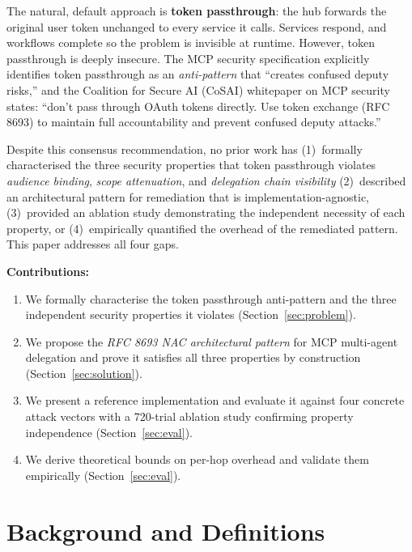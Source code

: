\documentclass[journal]{IEEEtran}
\begin{document}
The natural, default approach is \textbf{token passthrough}: the hub forwards
the original user token unchanged to every service it calls. Services respond,
and workflows complete so the problem is invisible at runtime. However,
token passthrough is deeply insecure. The MCP security specification \cite{mcp_security} explicitly
identifies token passthrough as an \textit{anti-pattern} that ``creates confused
deputy risks,'' and the Coalition for Secure AI (CoSAI) whitepaper on MCP
security \cite{cosai_mcp} states: ``don't pass through OAuth tokens directly.
Use token exchange (RFC 8693) to maintain full accountability and prevent confused
deputy attacks.''

Despite this consensus recommendation, no prior work has (1)~formally
characterised the three security properties that token passthrough
violates \textit{audience binding}, \textit{scope attenuation}, and
\textit{delegation chain visibility} (2)~described an architectural pattern for
remediation that is implementation-agnostic, (3)~provided an ablation study
demonstrating the independent necessity of each property, or (4)~empirically
quantified the overhead of the remediated pattern. This paper addresses all four
gaps.

\textbf{Contributions:}
\begin{enumerate}
  \item We formally characterise the token passthrough anti-pattern and the three
        independent security properties it violates
        (Section~\ref{sec:problem}).
  \item We propose the \textit{RFC 8693 NAC architectural pattern} for MCP
        multi-agent delegation and prove it satisfies all three properties by
        construction (Section~\ref{sec:solution}).
  \item We present a reference implementation and evaluate it against four
        concrete attack vectors with a 720-trial ablation study confirming
        property independence (Section~\ref{sec:eval}).
  \item We derive theoretical bounds on per-hop overhead and validate them
        empirically (Section~\ref{sec:eval}).
\end{enumerate}

\section{Background and Definitions}
\label{sec:background}
\end{document}
